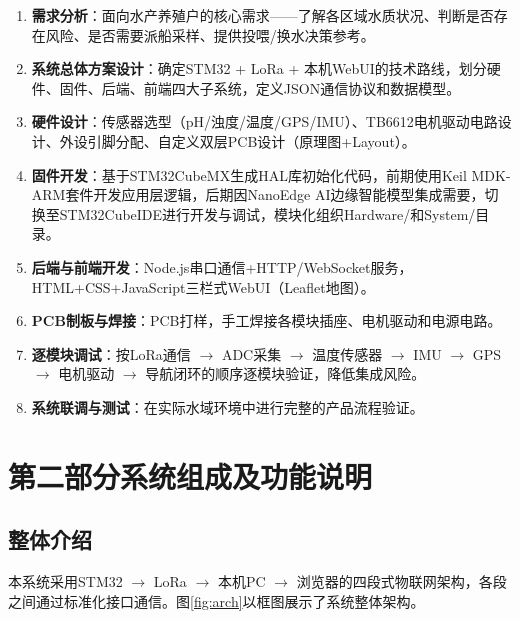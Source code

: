 \documentclass[12pt,a4paper]{ctexart}
\begin{document}
\begin{enumerate}[label=\textbf{阶段\arabic*：}]
    \item \textbf{需求分析}：面向水产养殖户的核心需求——了解各区域水质状况、判断是否存在风险、是否需要派船采样、提供投喂/换水决策参考。
    \item \textbf{系统总体方案设计}：确定STM32 + LoRa + 本机WebUI的技术路线，划分硬件、固件、后端、前端四大子系统，定义JSON通信协议和数据模型。
    \item \textbf{硬件设计}：传感器选型（pH/浊度/温度/GPS/IMU）、TB6612电机驱动电路设计、外设引脚分配、自定义双层PCB设计（原理图+Layout）。
    \item \textbf{固件开发}：基于STM32CubeMX生成HAL库初始化代码，前期使用Keil MDK-ARM套件开发应用层逻辑，后期因NanoEdge AI边缘智能模型集成需要，切换至STM32CubeIDE进行开发与调试，模块化组织Hardware/和System/目录。
    \item \textbf{后端与前端开发}：Node.js串口通信+HTTP/WebSocket服务，HTML+CSS+JavaScript三栏式WebUI（Leaflet地图）。
    \item \textbf{PCB制板与焊接}：PCB打样，手工焊接各模块插座、电机驱动和电源电路。
    \item \textbf{逐模块调试}：按LoRa通信 $\rightarrow$ ADC采集 $\rightarrow$ 温度传感器 $\rightarrow$ IMU $\rightarrow$ GPS $\rightarrow$ 电机驱动 $\rightarrow$ 导航闭环的顺序逐模块验证，降低集成风险。
    \item \textbf{系统联调与测试}：在实际水域环境中进行完整的产品流程验证。
\end{enumerate}

\section{第二部分\quad 系统组成及功能说明}

\subsection{整体介绍}

本系统采用STM32 $\rightarrow$ LoRa $\rightarrow$ 本机PC $\rightarrow$ 浏览器的四段式物联网架构，各段之间通过标准化接口通信。图\ref{fig:arch}以框图展示了系统整体架构。
\end{document}
